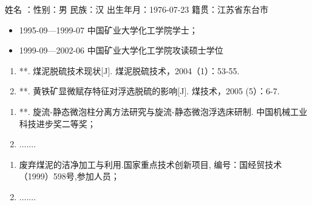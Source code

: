 \begin{resume}

姓名 ：\@author \quad 性别：男 \quad 民族：汉 \quad 出生年月：1976-07-23 \quad 籍贯：江苏省东台市 \par
\begin{itemize}
    \setlength{\itemindent}{5.4em}
    \item[] 1995-09—1999-07  中国矿业大学化工学院学士；
    \item[] 1999-09—2002-06  中国矿业大学化工学院攻读硕士学位
\end{itemize}

\begin{enumerate}
    \setlength{\itemindent}{-1.5em}
    \item **. 煤泥脱硫技术现状[J]. 煤泥脱硫技术，2004（1）：53-55.
    \item **. 黄铁矿显微赋存特征对浮选脱硫的影响[J]. 煤技术，2005 (5）：6-7.
\end{enumerate}

\begin{enumerate}
    \setlength{\itemindent}{-1.5em}
    \item **. 旋流-静态微泡柱分离方法研究与旋流-静态微泡浮选床研制. 中国机械工业科技进步奖二等奖；
    \item .......
\end{enumerate}

\begin{enumerate}
    \setlength{\itemindent}{-1.5em}
    \item 废弃煤泥的洁净加工与利用.国家重点技术创新项目, 编号：国经贸技术（1999）598号,参加人员；
    \item .......
\end{enumerate}

\end{resume}